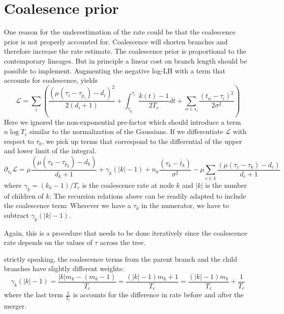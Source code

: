 \documentclass[aps,rmp, onecolumn]{revtex4}
\newcommand{\LH}{\mathcal{L}}
\begin{document}
\section*{Coalesence prior}
One reason for the underestimation of the rate could be that the coalescence prior is not properly accounted for.
Coalescence will shorten branches and therefore increase the rate estimate.
The coalescence prior is proportional to the contemporary lineages. But in principle a linear cost on branch length should be possible to implement.
Augmenting the negative log-LH with a term that accounts for coalescence, yields
\begin{equation}
    \LH  = \sum_i \left(\frac{(\mu(\tau_i - \tau_{p_i}) - d_i)^2}{2(d_i+1)} + \int_{\tau_{p_i}}^{\tau_i}\frac{k(t)-1}{2T_c}dt  + \sum_{\alpha \in s_i} \frac{(t_\alpha-\tau_i)^2}{2\sigma^2} \right)
\end{equation}
Here we ignored the non-exponential pre-factor which should introduce a term $n\log T_c$ similar to the normalization of the Gaussians.
If we differentiate $\LH$ with respect to $\tau_k$, we pick up terms that correspond to the differential of the upper and lower limit of the integral.
\begin{equation}
    \partial_{\tau_k} \LH  =\mu\frac{(\mu(\tau_k - \tau_{p_k}) -  d_k)}{d_k+1}  + \gamma_k(|k| - 1) +  n_k\frac{(\tau_k-\bar{t}_k)}{\sigma^2} -  \mu\sum_{c\in k} \frac{(\mu(\tau_{c} - \tau_{k}) - d_c)}{d_c+1}
\end{equation}
where $\gamma_k = (k_k-1)/T_c$ is the coalescence rate at node $k$ and $|k|$ is the number of children of $k$.
The recursion relations above can be readily adapted to include the coalescence term:
Wherever we have a $\tau_k$ in the numerator, we have to subtract $\gamma_k(|k|-1)$.

Again, this is a procedure that needs to be done iteratively since the coalescence rate depends on the values of $\tau$ across the tree.

strictly speaking, the coalescence terms from the parent branch and the child branches have slightly different weights:
\begin{equation}
    \gamma_k(|k| - 1) = \frac{|k|m_k - (m_k - 1)}{T_c} = \frac{(|k| - 1)m_k + 1}{T_c} = \frac{(|k| - 1)m_k}{T_c} + \frac{1}{T_c}
\end{equation}
where the last term $\frac{1}{T_c}$ is accounts for the difference in rate before and after the merger.
\end{document}
